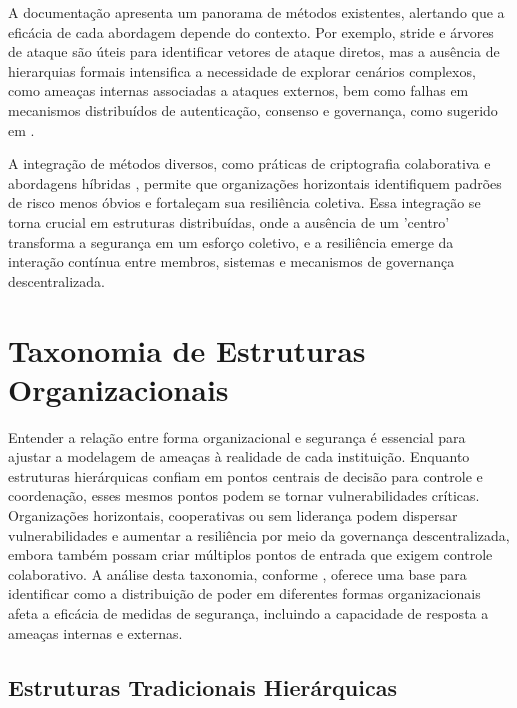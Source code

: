 A documentação \cite{ThreatModelingASummaryOfAvailableMethods} apresenta um
panorama de métodos existentes, alertando que a eficácia de cada abordagem
depende do contexto. Por exemplo, \gls{stride} e árvores de ataque são
úteis para identificar vetores de ataque diretos, mas a ausência de
hierarquias formais intensifica a necessidade de explorar cenários
complexos, como ameaças internas associadas a ataques externos, bem como
falhas em mecanismos distribuídos de autenticação, consenso e governança,
como sugerido em \cite{Colbac}.

A integração de métodos diversos, como práticas de criptografia
colaborativa \cite{AbcCrypto} e abordagens híbridas \cite{CoReTM}, permite
que organizações horizontais identifiquem padrões de risco menos óbvios e
fortaleçam sua resiliência coletiva. Essa integração se torna crucial em
estruturas distribuídas, onde a ausência de um 'centro' transforma a
segurança em um esforço coletivo, e a resiliência emerge da interação
contínua entre membros, sistemas e mecanismos de governança
descentralizada.

\section{Taxonomia de Estruturas Organizacionais}
\label{sec:taxonomia_de_estruturas_organizacionais}

Entender a relação entre forma organizacional e segurança é essencial para
ajustar a modelagem de ameaças à realidade de cada instituição. Enquanto
estruturas hierárquicas confiam em pontos centrais de decisão para controle
e coordenação, esses mesmos pontos podem se tornar vulnerabilidades
críticas. Organizações horizontais, cooperativas ou sem liderança podem
dispersar vulnerabilidades e aumentar a resiliência por meio da governança
descentralizada, embora também possam criar múltiplos pontos de entrada que
exigem controle colaborativo. A análise desta taxonomia, conforme
\cite{WorkerCooperativesinAmerica, RealNotNominalGlobalDemocracy}, oferece
uma base para identificar como a distribuição de poder em diferentes formas
organizacionais afeta a eficácia de medidas de segurança, incluindo a
capacidade de resposta a ameaças internas e externas.

\subsection{Estruturas Tradicionais Hierárquicas}
\label{sec:estruturas_tradicionais_hierarquicas}

